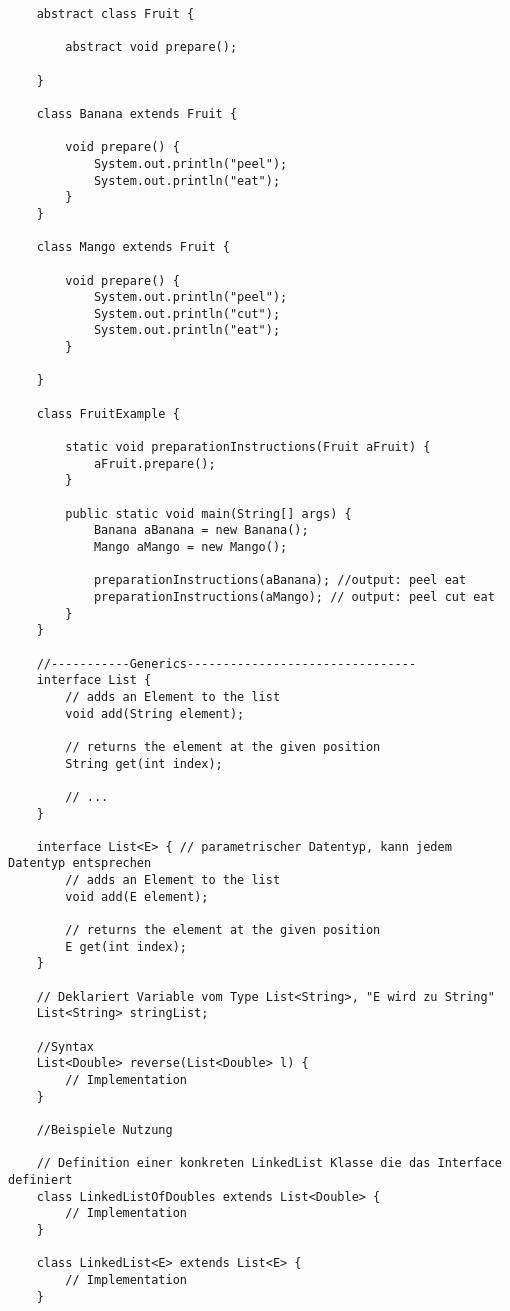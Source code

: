 \documentclass[a4paper,12pt]{article}
\begin{document}
\begin{lstlisting}
    abstract class Fruit {

        abstract void prepare();
      
    }

    class Banana extends Fruit {

        void prepare() {
            System.out.println("peel");
            System.out.println("eat");
        }
    }

    class Mango extends Fruit {

        void prepare() {
            System.out.println("peel");
            System.out.println("cut");
            System.out.println("eat");
        }

    }

    class FruitExample {

        static void preparationInstructions(Fruit aFruit) {
            aFruit.prepare();
        }

        public static void main(String[] args) {
            Banana aBanana = new Banana();
            Mango aMango = new Mango();

            preparationInstructions(aBanana); //output: peel eat
            preparationInstructions(aMango); // output: peel cut eat
        }
    }

    //-----------Generics--------------------------------
    interface List {
        // adds an Element to the list
        void add(String element);

        // returns the element at the given position
        String get(int index);

        // ...
    }

    interface List<E> { // parametrischer Datentyp, kann jedem Datentyp entsprechen
        // adds an Element to the list
        void add(E element);

        // returns the element at the given position
        E get(int index);
    }

    // Deklariert Variable vom Type List<String>, "E wird zu String"
    List<String> stringList;

    //Syntax
    List<Double> reverse(List<Double> l) {
        // Implementation
    }

    //Beispiele Nutzung

    // Definition einer konkreten LinkedList Klasse die das Interface definiert
    class LinkedListOfDoubles extends List<Double> {
        // Implementation
    }

    class LinkedList<E> extends List<E> {
        // Implementation
    }


\end{lstlisting}
\end{document}
